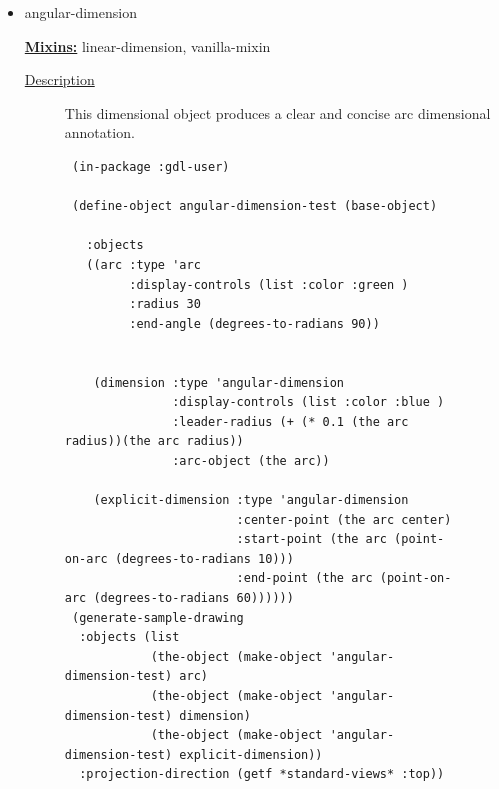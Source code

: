 \documentclass [11pt]{book}
\begin{document}
\begin{itemize}

\item {}angular-dimension


\textbf{
\underline{Mixins:}} linear-dimension, vanilla-mixin





\begin{description}

\item [
\underline{Description}]


This dimensional object produces a clear and concise arc dimensional annotation.



\end{description}




\begin{figure}
\begin{lrbox}{\boxedverb}
\begin{minipage}{\linewidth}
{\small

\begin{verbatim}
 (in-package :gdl-user)

 (define-object angular-dimension-test (base-object) 
   
   :objects 
   ((arc :type 'arc
         :display-controls (list :color :green )
         :radius 30
         :end-angle (degrees-to-radians 90))
    
    
    (dimension :type 'angular-dimension
               :display-controls (list :color :blue )
               :leader-radius (+ (* 0.1 (the arc radius))(the arc radius))
               :arc-object (the arc))
    
    (explicit-dimension :type 'angular-dimension
                        :center-point (the arc center)
                        :start-point (the arc (point-on-arc (degrees-to-radians 10)))
                        :end-point (the arc (point-on-arc (degrees-to-radians 60))))))
 (generate-sample-drawing 
  :objects (list 
            (the-object (make-object 'angular-dimension-test) arc) 
            (the-object (make-object 'angular-dimension-test) dimension)
            (the-object (make-object 'angular-dimension-test) explicit-dimension))
  :projection-direction (getf *standard-views* :top))
 
  
\end{verbatim}}
\end{minipage}
\end{lrbox}
\fbox{\usebox{\boxedverb}}


\end{figure}
\end{itemize}
\end{document}
